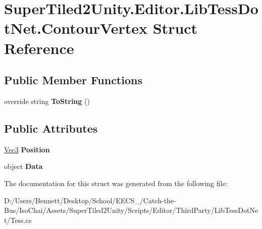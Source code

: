 \hypertarget{struct_super_tiled2_unity_1_1_editor_1_1_lib_tess_dot_net_1_1_contour_vertex}{}\section{Super\+Tiled2\+Unity.\+Editor.\+Lib\+Tess\+Dot\+Net.\+Contour\+Vertex Struct Reference}
\label{struct_super_tiled2_unity_1_1_editor_1_1_lib_tess_dot_net_1_1_contour_vertex}
\subsection*{Public Member Functions}
\begin{DoxyCompactItemize}
\item 
\mbox{\label{struct_super_tiled2_unity_1_1_editor_1_1_lib_tess_dot_net_1_1_contour_vertex_a9915dae3242050ddd8ab9b64566ac7bb}} 
override string {\bfseries To\+String} ()
\end{DoxyCompactItemize}
\subsection*{Public Attributes}
\begin{DoxyCompactItemize}
\item 
\mbox{\label{struct_super_tiled2_unity_1_1_editor_1_1_lib_tess_dot_net_1_1_contour_vertex_a0e900a4fe4b80c4c7af14669eccb73a4}} 
\mbox{\hyperlink{struct_super_tiled2_unity_1_1_editor_1_1_lib_tess_dot_net_1_1_vec3}{Vec3}} {\bfseries Position}
\item 
\mbox{\label{struct_super_tiled2_unity_1_1_editor_1_1_lib_tess_dot_net_1_1_contour_vertex_a7fabab448200cce6a211e852045fc57c}} 
object {\bfseries Data}
\end{DoxyCompactItemize}


The documentation for this struct was generated from the following file\+:\begin{DoxyCompactItemize}
\item 
D\+:/\+Users/\+Bennett/\+Desktop/\+School/\+E\+E\+C\+S\+\_/\+Catch-\/the-\/\+Bus/\+Iso\+Chai/\+Assets/\+Super\+Tiled2\+Unity/\+Scripts/\+Editor/\+Third\+Party/\+Lib\+Tess\+Dot\+Net/Tess.\+cs\end{DoxyCompactItemize}
